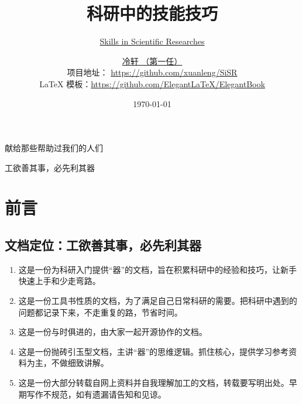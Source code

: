 \documentclass[cn,11pt,chinese,twoside]{elegantbook}
\title{科研中的技能技巧}
\subtitle{\href{http://lengxuan.me/open-source-project/}{Skills in Scientific Researches}}
\author{\href{https://xuanleng.me}{冷轩 （第一任）}\\
{\kaishu 项目地址}： \url{https://github.com/xuanleng/SiSR}\\
{\kaishu \LaTeX{} 模板}：\url{https://github.com/ElegantLaTeX/ElegantBook}
}
\date{\today}
\begin{document}
\setlength{\abovedisplayskip}{2pt plus 1pt minus 1pt}
\setlength{\belowdisplayskip}{4pt plus 1pt minus 1pt}
\setlength{\arraycolsep}{2pt}
\allowdisplaybreaks[4]

\maketitle
\frontmatter


\newpage
\thispagestyle{empty}
\noindent\begin{center}
{\fontsize{20pt}{0}\kaishu 献给那些帮助过我们的人们}
\end{center} 

\newpage
\thispagestyle{empty}
\noindent\begin{center}
{\fontsize{20pt}{0}\kaishu 工欲善其事，必先利其器} %
\end{center} 


\tableofcontents
\label{content}
\mainmatter


\chapter*{前言}
\section*{文档定位：工欲善其事，必先利其器}
\begin{enumerate}
\item 这是一份为科研入门提供“器”的文档，旨在积累科研中的经验和技巧，让新手快速上手和少走弯路。
\item 这是一份工具书性质的文档，为了满足自己日常科研的需要。把科研中遇到的问题都记录下来，不走重复的路，节省时间。
\item 这是一份与时俱进的，由大家一起开源协作的文档。
\item 这是一份抛砖引玉型文档，主讲“器”的思维逻辑。抓住核心，提供学习参考资料为主，不做细致讲解。
\item 这是一份大部分转载自网上资料并自我理解加工的文档，转载要写明出处。早期写作不规范，如有遗漏请告知和见谅。
\end{enumerate}
\end{document}
